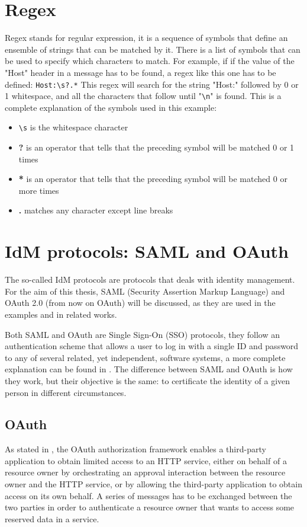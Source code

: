 \section{Regex}
Regex stands for regular expression, it is a sequence of symbols that define an ensemble of strings that can be matched by it. There is a list of symbols that can be used to specify which characters to match. For example, if if the value of the "Host" header in a message has to be found, a regex like this one has to be defined: \verb|Host:\s?.*|
This regex will search for the string "Host:" followed by 0 or 1 whitespace, and all the characters that follow until "\verb|\n|" is found. This is a complete explanation of the symbols used in this example:
\begin{itemize}
    \item \verb|\s| is the whitespace character
    \item \textbf{?} is an operator that tells that the preceding symbol will be matched 0 or 1 times
    \item \textbf{*} is an operator that tells that the preceding symbol will be matched 0 or more times
    \item \textbf{.} matches any character except line breaks
\end{itemize}

\section{IdM protocols: SAML and OAuth}
The so-called IdM protocols are protocols that deals with identity management. For the aim of this thesis, \gls{SAML} (Security Assertion Markup Language) and \Gls{OAuth} 2.0 (from now on \Gls{OAuth}) will be discussed, as they are used in the examples and in related works.

Both \Gls{SAML} and \Gls{OAuth} are Single Sign-On (SSO) protocols, they follow an authentication scheme that allows a user to log in with a single ID and password to any of several related, yet independent, software systems, a more complete explanation can be found in \cite{claudio_grisenti}. 
The difference between \Gls{SAML} and \Gls{OAuth} is how they work, but their objective is the same: to certificate the identity of a given person in different circumstances.

\subsection{OAuth}
As stated in \cite{ietf_oauth2}, the \Gls{OAuth} authorization framework enables a third-party application to obtain limited access to an HTTP service, either on behalf of a resource owner by orchestrating an approval interaction between the resource owner and the HTTP service, or by allowing the third-party application to obtain access on its own behalf.
A series of messages has to be exchanged between the two parties in order to authenticate a resource owner that wants to access some reserved data in a service.

